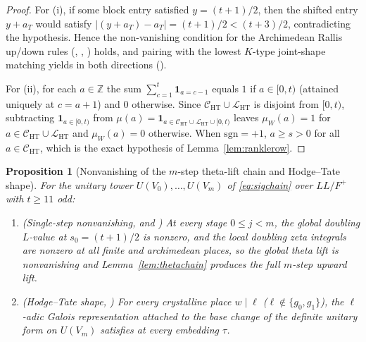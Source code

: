 \documentclass[11pt]{amsart}
\newcommand{\Z}{\mathbb{Z}}
\theoremstyle{plain}
\newtheorem{proposition}[theorem]{Proposition}
\theoremstyle{definition}
\numberwithin{equation}{section}
\begin{document}
\begin{proof}
For (i), if some block entry satisfied $y=(t+1)/2$, then the shifted entry $y+a_T$ would satisfy
$|(y+a_T)-a_T|=(t+1)/2<(t+3)/2$, contradicting the  hypothesis. Hence the
non-vanishing condition for the Archimedean Rallis up/down rules (,
, ) holds, and pairing with the lowest
$K$-type joint-shape matching yields  in both directions ().

For (ii), for each $a\in\Z$ the sum $\sum_{c=1}^t\mathbf{1}_{a=c-1}$ equals $1$ if $a\in[0,t)$
(attained uniquely at $c=a+1$) and $0$ otherwise. Since $\mathcal C_{\mathrm{HT}}\cup\mathcal L_{\mathrm{HT}}$
is disjoint from $[0,t)$, subtracting $\mathbf{1}_{a\in[0,t)}$ from
$\mu(a)=\mathbf{1}_{a\in\mathcal C_{\mathrm{HT}}\cup\mathcal L_{\mathrm{HT}}\cup[0,t)}$ leaves
$\mu_W(a)=1$ for $a\in\mathcal C_{\mathrm{HT}}\cup\mathcal L_{\mathrm{HT}}$ and $\mu_W(a)=0$
otherwise. When $\mathrm{sgn}=+1$, $a\ge s>0$ for all $a\in\mathcal C_{\mathrm{HT}}$, which is the
exact hypothesis of Lemma~\ref{lem:ranklerow}.
\end{proof}

\begin{proposition}[Nonvanishing of the $m$-step theta-lift chain and Hodge--Tate shape]\label{prop:thetanonvan}
For the unitary tower $U(V_0),\dots,U(V_m)$ of \eqref{eq:sigchain} over $LL/F^+$ with $t\ge 11$
odd:
\begin{enumerate}[label=(\roman*)]
\item \textup{(Single-step nonvanishing,  and )} At every stage
  $0\le j<m$, the global doubling $L$-value at $s_0=(t+1)/2$ is nonzero, and the local doubling
  zeta integrals are nonzero at all finite and archimedean places, so the global theta lift is
  nonvanishing and Lemma~\ref{lem:thetachain} produces the full $m$-step upward lift.
\item \textup{(Hodge--Tate shape, )} For every crystalline place $w\mid\ell$
  ($\ell\notin\{g_0,g_1\}$), the $\ell$-adic Galois representation attached to the base change of
  the definite unitary form on $U(V_m)$ satisfies  at every embedding $\tau$.
\end{enumerate}
\end{proposition}
\end{document}
